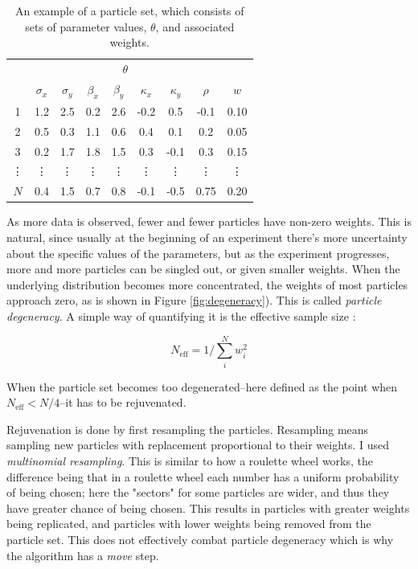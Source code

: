 \documentclass{article}\usepackage{knitr}
\begin{document}
\begin{table}[!htb]
\centering
\caption{An example of a particle set, which consists of sets of parameter values, $\theta$, and associated weights.}
\vspace{0.5cm}
\label{table:particleSet}
\begin{tabular}{ccccccccc}
\toprule

& \multicolumn{7}{c}{$\theta$}    \\
\cmidrule(lr){2-8}
& $\sigma_x$  & $\sigma_y$  & $\beta_x$   & $\beta_y$   & $\kappa_x$ & $\kappa_y$ & $\rho$   & $w$  \\
\midrule
1    & 1.2  &  2.5 &  0.2 & 2.6 & -0.2 & 0.5 & -0.1 & 0.10 \\
2    & 0.5  &  0.3 &  1.1 & 0.6 &  0.4 & 0.1 & 0.2 & 0.05 \\
3    & 0.2  &  1.7 &  1.8 & 1.5 &  0.3 & -0.1 & 0.3 & 0.15 \\
\vdots & \vdots  &  \vdots &  \vdots & \vdots & \vdots  & \vdots & \vdots  & \vdots  \\
$N$  & 0.4  &  1.5 &  0.7 & 0.8 & -0.1 & -0.5& 0.75 & 0.20 \\
\bottomrule
\end{tabular}
\end{table}

As more data is observed, fewer and fewer particles have non-zero weights. This is natural, since usually at the beginning of an experiment there's more uncertainty about the specific values of the parameters, but as the experiment progresses, more and more particles can be singled out, or given smaller weights. When the underlying distribution becomes more concentrated, the weights of most particles approach zero, as is shown in Figure \ref{fig:degeneracy}). This is called \textit{particle degeneracy}. A simple way of quantifying it is the effective sample size \citep{speekenbrink2016}:

\begin{equation}
N_{\text{eff}} = 1 / \sum_{i}^{N} w_i^2
\end{equation}

When the particle set becomes too degenerated--here defined as the point when $N_{\text{eff}} < N/4$--it has to be rejuvenated. 

Rejuvenation is done by first resampling the particles. Resampling means sampling new particles with replacement proportional to their weights. I used \textit{multinomial resampling}. This is similar to how a roulette wheel works, the difference being that in a roulette wheel each number has a uniform probability of being chosen; here the "sectors" for some particles are wider, and thus they have greater chance of being chosen. This results in particles with greater weights being replicated, and particles with lower weights being removed from the particle set. This does not effectively combat particle degeneracy which is why the algorithm has a \textit{move} step. \citep{chopin2002}
\end{document}

